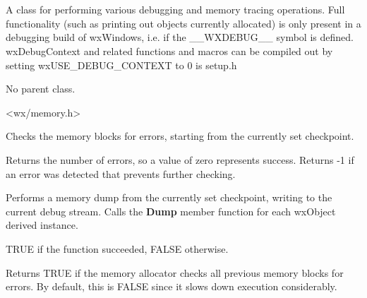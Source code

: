 \section{}\label{wxdebugcontext}

A class for performing various debugging and memory tracing
operations. Full functionality (such as printing out objects
currently allocated) is only present in a debugging build of wxWindows,
i.e. if the \_\_WXDEBUG\_\_ symbol is defined. wxDebugContext
and related functions and macros can be compiled out by setting
wxUSE\_DEBUG\_CONTEXT to 0 is setup.h


No parent class.


<wx/memory.h>




\label{wxdebugcontextcheck}


Checks the memory blocks for errors, starting from the currently set
checkpoint.


Returns the number of errors,
so a value of zero represents success. Returns -1 if an error
was detected that prevents further checking.

\label{wxdebugcontextdump}


Performs a memory dump from the currently set checkpoint, writing to the
current debug stream. Calls the {\bf Dump} member function for each wxObject
derived instance.


TRUE if the function succeeded, FALSE otherwise.

\label{wxdebugcontextgetcheckprevious}


Returns TRUE if the memory allocator checks all previous memory blocks for errors.
By default, this is FALSE since it slows down execution considerably.

